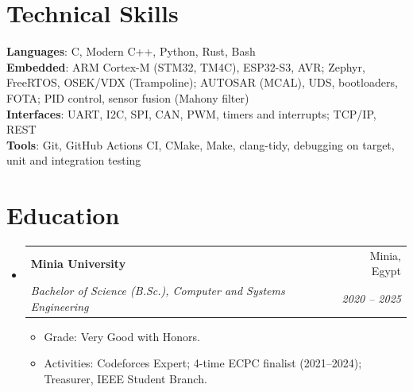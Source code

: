 \documentclass[letterpaper,11pt]{article}
\makeatletter
\newcommand{\resumeItem}[1]{
  \item\small{
    {#1 \vspace{-2pt}}
  }
}
\newcommand{\resumeSubheading}[4]{
  \vspace{-2pt}\item
    \begin{tabular*}{0.97\textwidth}[t]{l@{\extracolsep{\fill}}r}
      \textbf{#1} & #2 \\
      \textit{\small#3} & \textit{\small #4} \\
    \end{tabular*}\vspace{-7pt}
}
\newcommand{\resumeSubHeadingListStart}{\begin{itemize}[leftmargin=0.15in, label={}]}
\newcommand{\resumeSubHeadingListEnd}{\end{itemize}}
\newcommand{\resumeItemListStart}{\begin{itemize}}
\newcommand{\resumeItemListEnd}{\end{itemize}\vspace{-5pt}}
\makeatother
\begin{document}
\section{Technical Skills}
 \begin{itemize}[leftmargin=0.15in, label={}]
    \small{\item{
     \textbf{Languages}{: C, Modern C++, Python, Rust, Bash} \\
     \textbf{Embedded}{: ARM Cortex-M (STM32, TM4C), ESP32-S3, AVR; Zephyr, FreeRTOS, OSEK/VDX (Trampoline); AUTOSAR (MCAL), UDS, bootloaders, FOTA; PID control, sensor fusion (Mahony filter)} \\
     \textbf{Interfaces}{: UART, I2C, SPI, CAN, PWM, timers and interrupts; TCP/IP, REST} \\
     \textbf{Tools}{: Git, GitHub Actions CI, CMake, Make, clang-tidy, debugging on target, unit and integration testing}
    }}
 \end{itemize}

\section{Education}
  \resumeSubHeadingListStart
    \resumeSubheading
      {Minia University}{Minia, Egypt}
      {Bachelor of Science (B.Sc.), Computer and Systems Engineering}{2020 -- 2025}
      \resumeItemListStart
        \resumeItem{Grade: Very Good with Honors.}
        \resumeItem{Activities: Codeforces Expert; 4-time ECPC finalist (2021--2024); Treasurer, IEEE Student Branch.}
      \resumeItemListEnd
  \resumeSubHeadingListEnd


\end{document}
